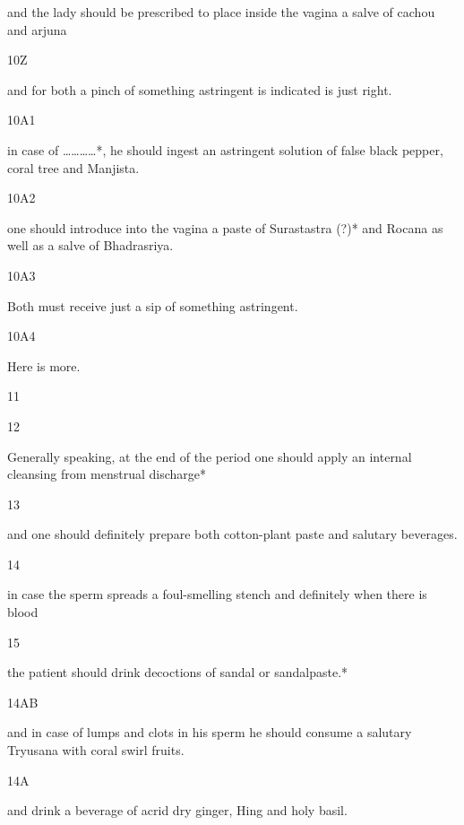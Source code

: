 \begin{translation}
\begin{tt}
 and the lady should be prescribed to place  inside the vagina a salve of 
  cachou and arjuna
  
\item[10Z]

and for both a pinch of something astringent is indicated is just right.
  
\item[10A1]

in case of …………*, he should ingest an astringent solution of false 
  black pepper, coral tree and Manjista.
  
\item[10A2]

one should introduce into the vagina a paste of Surastastra (?)* and 
  Rocana as well as  a salve of Bhadrasriya.
  
\item[10A3]

Both must receive just a sip of something astringent.
  
\item[10A4]

Here is more.
  
\item[11]


  
\item[12]

Generally speaking, at the end of the period one should apply an internal 
  cleansing from menstrual discharge*
  
  
\item[13]

and one should definitely prepare both cotton-plant paste and salutary 
  beverages.
  
\item[14]

in case the sperm spreads a foul-smelling stench and definitely when 
  there is blood
  
\item[15]

the patient should drink decoctions of sandal or sandalpaste.*
  
\item[14AB]

and in case of lumps and clots in his sperm he should consume a 
  salutary Tryusana with coral swirl fruits.
  
\item[14A]

and drink a beverage of acrid dry ginger, Hing and holy basil.
  

\end{tt}
\end{translation}
